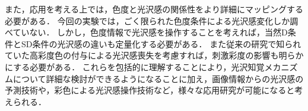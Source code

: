         また，応用を考える上では，色度と光沢感の関係性をより詳細にマッピングする必要がある．
        今回の実験では，ごく限られた色度条件による光沢感変化しか調べていない．
        しかし，色度情報で光沢感を操作することを考えれば，当然D条件とSD条件の光沢感の違いも定量化する必要がある．
        また従来の研究で知られていた高彩度色の付与による光沢感喪失\cite{Nishida}を考慮すれば，刺激彩度の影響も明らかにする必要がある．
        これらを包括的に理解することにより，光沢知覚メカニズムについて詳細な検討ができるようになることに加え，画像情報からの光沢感の予測技術や，彩色による光沢感操作技術など，様々な応用研究が可能になると考えられる．

    \newpage
